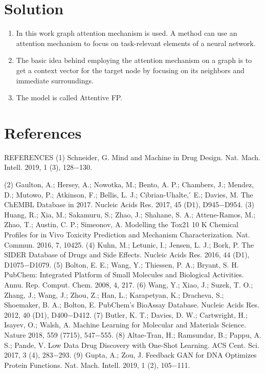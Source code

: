 \documentclass[12pt]{osa-supplemental-document}
\begin{document}
\section*{Solution}
\begin{enumerate}
  \item In this work graph attention mechanism is used. A method can use an attention mechanism to focus on task-relevant elements of a neural network.
  \item The basic idea behind employing the attention mechanism on a graph is to get a context vector for the target node by focusing on its neighbors and immediate surroundings. 
  \item The model is called Attentive FP.
\end{enumerate}
\section*{References} 
 REFERENCES
(1) Schneider, G. Mind and Machine in Drug Design. Nat. Mach.
Intell. 2019, 1 (3), 128−130.

(2) Gaulton, A.; Hersey, A.; Nowotka, M.; Bento, A. P.; Chambers,
J.; Mendez, D.; Mutowo, P.; Atkinson, F.; Bellis, L. J.; Cibrian-Uhalte, ́
E.; Davies, M. The ChEMBL Database in 2017. Nucleic Acids Res.
2017, 45 (D1), D945−D954.
(3) Huang, R.; Xia, M.; Sakamuru, S.; Zhao, J.; Shahane, S. A.;
Attene-Ramos, M.; Zhao, T.; Austin, C. P.; Simeonov, A. Modelling
the Tox21 10 K Chemical Profiles for in Vivo Toxicity Prediction and
Mechanism Characterization. Nat. Commun. 2016, 7, 10425.
(4) Kuhn, M.; Letunic, I.; Jensen, L. J.; Bork, P. The SIDER
Database of Drugs and Side Effects. Nucleic Acids Res. 2016, 44 (D1),
D1075−D1079.
(5) Bolton, E. E.; Wang, Y.; Thiessen, P. A.; Bryant, S. H. PubChem:
Integrated Platform of Small Molecules and Biological Activities.
Annu. Rep. Comput. Chem. 2008, 4, 217.
(6) Wang, Y.; Xiao, J.; Suzek, T. O.; Zhang, J.; Wang, J.; Zhou, Z.;
Han, L.; Karapetyan, K.; Dracheva, S.; Shoemaker, B. A.; Bolton, E.
PubChem’s BioAssay Database. Nucleic Acids Res. 2012, 40 (D1),
D400−D412.
(7) Butler, K. T.; Davies, D. W.; Cartwright, H.; Isayev, O.; Walsh,
A. Machine Learning for Molecular and Materials Science. Nature
2018, 559 (7715), 547−555.
(8) Altae-Tran, H.; Ramsundar, B.; Pappu, A. S.; Pande, V. Low
Data Drug Discovery with One-Shot Learning. ACS Cent. Sci. 2017, 3
(4), 283−293.
(9) Gupta, A.; Zou, J. Feedback GAN for DNA Optimizes Protein
Functions. Nat. Mach. Intell. 2019, 1 (2), 105−111.
\end{document}
